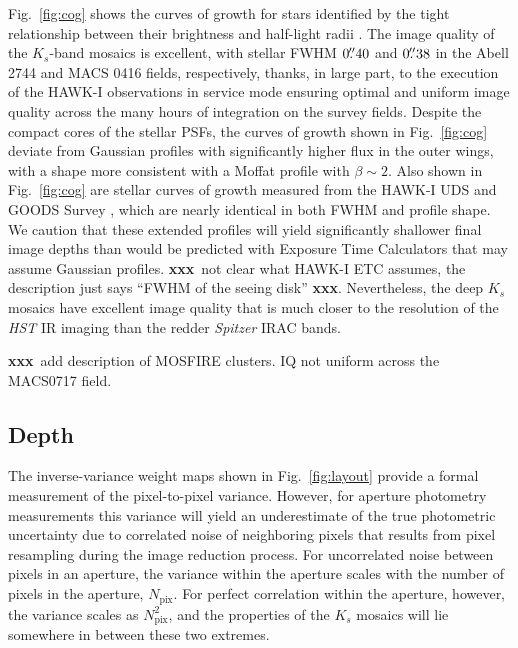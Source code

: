 \documentclass[iop, numberedappendix]{emulateapj}
\gdef\xxx{\textbf{xxx}}
\begin{document}
Fig.~\ref{fig:cog} shows the curves of growth for stars identified by the tight relationship between their brightness and half-light radii \citep[see, e.g., Fig.~13 of][]{skelton:14}.  The image quality of the $K_s$-band mosaics is excellent, with stellar FWHM $0\mbox{$.\!\!^{\prime\prime}$}40$ and $0\mbox{$.\!\!^{\prime\prime}$}38$ in the Abell 2744 and MACS 0416 fields, respectively, thanks, in large part, to the execution of the HAWK-I observations in service mode ensuring optimal and uniform image quality across the many hours of integration on the survey fields.  Despite the compact cores of the stellar PSFs, the curves of growth shown in Fig.~\ref{fig:cog} deviate from Gaussian profiles with significantly higher flux in the outer wings, with a shape more consistent with a Moffat profile \citep{trujillo:01}  with $\beta\sim2$.  Also shown in Fig.~\ref{fig:cog} are stellar curves of growth measured from the HAWK-I UDS and GOODS Survey \citep[HUGS;][]{hugs}, which are nearly identical in both FWHM and profile shape.  We caution that these extended profiles will yield significantly shallower final image depths than would be predicted with Exposure Time Calculators that may assume Gaussian profiles. \xxx\ not clear what HAWK-I ETC assumes, the description just says ``FWHM of the seeing disk'' \xxx.  Nevertheless, the deep $K_s$ mosaics have excellent image quality that is much closer to the resolution of the \textit{HST} IR imaging than the redder \textit{Spitzer} IRAC bands.

\xxx\ add description of MOSFIRE clusters.  IQ not uniform across the MACS0717 field.

\subsection{Depth}
\label{s:depth}

The inverse-variance weight maps shown in Fig.~\ref{fig:layout} provide a formal measurement of the pixel-to-pixel variance.  However, for aperture photometry measurements this variance will yield an underestimate of the true photometric uncertainty due to correlated noise of neighboring pixels that results from pixel resampling during the image reduction process.  For uncorrelated noise between pixels in an aperture, the variance within the aperture scales with the number of pixels in the aperture, $N_\mathrm{pix}$.  For perfect correlation within the aperture, however, the variance scales as $N_\mathrm{pix}^2$, and the properties of the $K_s$ mosaics will lie somewhere in between these two extremes.
\end{document}
